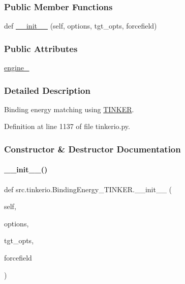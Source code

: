 \subsubsection*{Public Member Functions}
\begin{DoxyCompactItemize}
\item 
def \hyperlink{classsrc_1_1tinkerio_1_1BindingEnergy__TINKER_a44ba714ed22880f4352bc33fca45a282}{\+\_\+\+\_\+init\+\_\+\+\_\+} (self, options, tgt\+\_\+opts, forcefield)
\end{DoxyCompactItemize}
\subsubsection*{Public Attributes}
\begin{DoxyCompactItemize}
\item 
\hyperlink{classsrc_1_1tinkerio_1_1BindingEnergy__TINKER_a92ac44cf220acb8699075c83afb66ae5}{engine\+\_\+}
\end{DoxyCompactItemize}


\subsubsection{Detailed Description}
Binding energy matching using \hyperlink{classsrc_1_1tinkerio_1_1TINKER}{T\+I\+N\+K\+ER}. 



Definition at line 1137 of file tinkerio.\+py.



\subsubsection{Constructor \& Destructor Documentation}
\mbox{\label{classsrc_1_1tinkerio_1_1BindingEnergy__TINKER_a44ba714ed22880f4352bc33fca45a282}} 
\paragraph{\texorpdfstring{\+\_\+\+\_\+init\+\_\+\+\_\+()}{\_\_init\_\_()}}
{\footnotesize\ttfamily def src.\+tinkerio.\+Binding\+Energy\+\_\+\+T\+I\+N\+K\+E\+R.\+\_\+\+\_\+init\+\_\+\+\_\+ (\begin{DoxyParamCaption}\item[{}]{self,  }\item[{}]{options,  }\item[{}]{tgt\+\_\+opts,  }\item[{}]{forcefield }\end{DoxyParamCaption})}



